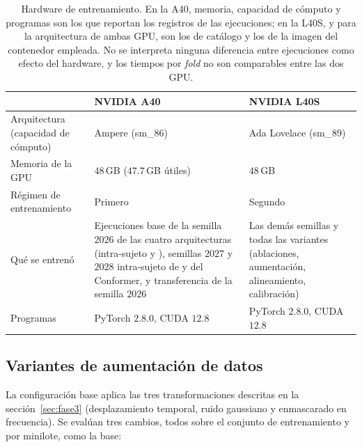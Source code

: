 \begin{table}[H]
\centering
\caption{Hardware de entrenamiento. En la A40, memoria, capacidad de cómputo y programas son
los que reportan los registros de las ejecuciones; en la L40S, y para la arquitectura de
ambas GPU, son los de catálogo y los de la imagen del contenedor empleada. No
se interpreta ninguna diferencia entre ejecuciones como efecto del hardware, y los tiempos por
\textit{fold} no son comparables entre las dos GPU.}
\label{tab:hardware}
\small
\begin{tabular}{@{}p{3.6cm}p{5.2cm}p{5.2cm}@{}}
\toprule
 & \textbf{NVIDIA A40} & \textbf{NVIDIA L40S} \\
\midrule
Arquitectura (capacidad de cómputo) & Ampere (sm\_86) & Ada Lovelace (sm\_89) \\
Memoria de la GPU                   & $48$\,GB ($47.7$\,GB útiles) & $48$\,GB \\
Régimen de entrenamiento            & Primero & Segundo \\
Qué se entrenó                      & Ejecuciones base de la semilla $2026$ de las cuatro arquitecturas (intra-sujeto y \loso{}), semillas $2027$ y $2028$ intra-sujeto de \eegnet{} y del Conformer, y transferencia de la semilla $2026$ & Las demás semillas y todas las variantes (ablaciones, aumentación, alineamiento, calibración) \\
Programas                           & PyTorch $2.8.0$, CUDA $12.8$ & PyTorch $2.8.0$, CUDA $12.8$ \\
\bottomrule
\end{tabular}
\end{table}

\subsection{Variantes de aumentación de datos}
\label{sec:variantes-aug}

La configuración base aplica las tres transformaciones descritas en la
sección~\ref{sec:fase3} (desplazamiento temporal, ruido gaussiano y enmascarado en
frecuencia). Se evalúan tres cambios, todos sobre el conjunto de entrenamiento y por
minilote, como la base:

